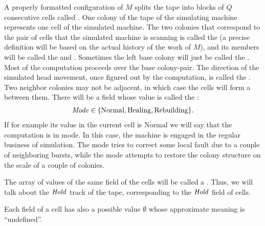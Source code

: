 \documentclass[11pt]{memoir}
\theoremstyle{definition} %
\newcommand{\fld}[1]{\ensuremath{\textit{#1\/}}}
\newcommand{\Q}{Q}
\newcommand{\Hold}{\fld{Hold}}
\newcommand{\Mode}{\fld{Mode}}
\newcommand{\Normal}{\mathrm{Normal}}
\newcommand{\Rebuilding}{\mathrm{Rebuilding}}
\newcommand{\Healing}{\mathrm{Healing}}
\begin{document}
A properly formatted configuration of \( M \) splits the tape into blocks of \( \Q \)
consecutive cells called .
One colony of the tape of the simulating
machine represents one cell of the simulated machine.
The two colonies that correspond to the pair of cells that the
simulated machine is scanning is called the 
(a precise definition will be based on the actual history of the work of \( M \)), and its
members will be called the  and .
Sometimes the left base colony will just be called the .
Most of the computation proceeds over the base colony-pair.
The direction of the simulated head movement, once figured out by the computation,
is called the .
Two neighbor colonies may not be adjacent, in which case the cells will form
a  between them.
There will be a field whose value is called the :
 \begin{align*}
   \Mode\in\{ \Normal,\Healing, \Rebuilding \}.
 \end{align*}
 If for example its value in the current cell is \( \Normal \) we will say that the
 computation is in  mode.
 In this case, the machine is engaged in the regular business of simulation.
The  mode tries to correct some local fault due to a couple of neighboring
bursts, while the  mode attempts to restore the colony structure
on the scale of a couple of colonies.

The array of values of the same field of the cells will be called a .
Thus, we will talk about the \( \Hold \) track of the tape, corresponding to the
\( \Hold \) field of cells.

Each field of a cell has also a possible value
\( \emptyset \) whose approximate meaning is ``undefined''.
\end{document}
